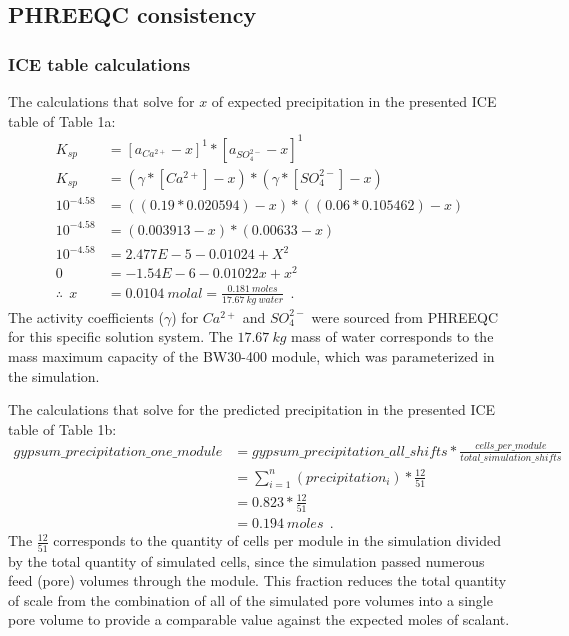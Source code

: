\begin{supplementary}
\subsection{PHREEQC consistency}

\subsubsection{ICE table calculations}
The calculations that solve for $x$ of expected precipitation in the presented ICE table of Table 1a:
\begin{equation} \label{ice_calculations}
    \begin{split}
        K_{sp} &= [a_{Ca^{2+}} - x]^1 * [a_{SO_4^{2-}} - x]^1 \\ 
        K_{sp} &= (\gamma*[Ca^{2+}] - x) * (\gamma*[SO_4^{2-}] - x) \\ 
        10^{-4.58} &= ((0.19*0.020594) - x) * ((0.06*0.105462) - x) \\ 
        10^{-4.58} &= (0.003913 - x) * (0.00633 - x) \\
        10^{-4.58} &= 2.477E-5 - 0.01024 + X^2 \\
        0 &= -1.54E-6 - 0.01022x + x^2 \\
         \therefore ~~ x &= 0.0104~molal = \frac{0.181~moles}{17.67~kg~water}~~.
    \end{split}
\end{equation}
The activity coefficients ($\gamma$) for $Ca^{2+}$ and $SO_4^{2-}$ were sourced from PHREEQC for this specific solution system. The $17.67~kg$ mass of water corresponds to the mass maximum capacity of the BW30-400 module, which was parameterized in the simulation.  

The calculations that solve for the predicted precipitation in the presented ICE table of Table 1b:
\begin{equation} \label{PHREEQC_output_precipitation}
    \begin{split}
        gypsum\_precipitation\_one\_module &= gypsum\_precipitation\_all\_shifts * \frac{cells\_per\_module}{total\_simulation\_shifts} \\
         &= \sum_{i=1}^n (precipitation_i) * \frac{12}{51} \\ 
         &= 0.823 * \frac{12}{51} \\ 
         &= 0.194 ~moles ~~.
    \end{split}
\end{equation}
The $\frac{12}{51}$ corresponds to the quantity of cells per module in the simulation divided by the total quantity of simulated cells, since the simulation passed numerous feed (pore) volumes through the module. This fraction reduces the total quantity of scale from the combination of all of the simulated pore volumes into a single pore volume to provide a comparable value against the expected moles of scalant.


\end{supplementary}
